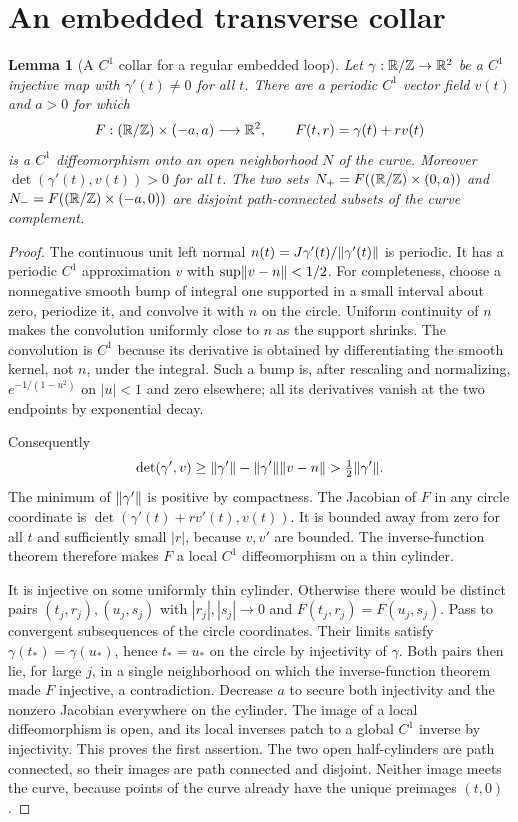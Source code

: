 \documentclass[11pt,oneside]{book}
\newtheorem{lemma}[theorem]{Lemma}
\theoremstyle{definition}
\theoremstyle{remark}\newtheorem{remark}[theorem]{Remark}
\newcommand{\R}{\mathbb R}\newcommand{\C}{\mathbb C}
\begin{document}
\section{An embedded transverse collar}
\begin{lemma}[A $C^1$ collar for a regular embedded loop]\label{d13:21:collar}
Let $\gamma:\R/\Z\to\R^2$ be a $C^1$ injective map with
$\gamma'(t)\ne0$ for all $t$. There are a periodic $C^1$ vector
field $v(t)$ and $a>0$ for which
\[
 F:(\R/\Z)\times(-a,a)\longrightarrow\R^2,
 \qquad F(t,r)=\gamma(t)+rv(t)
\]
is a $C^1$ diffeomorphism onto an open neighborhood $N$ of the curve.
Moreover $\det(\gamma'(t),v(t))>0$ for all $t$. The two sets
$N_+=F((\R/\Z)\times(0,a))$ and
$N_-=F((\R/\Z)\times(-a,0))$ are disjoint path-connected subsets
of the curve complement.
\end{lemma}
\begin{proof}
The continuous unit left normal
$n(t)=J\gamma'(t)/\lVert\gamma'(t)\rVert$ is periodic. It has a periodic
$C^1$ approximation $v$ with $\sup\lVert v-n\rVert<1/2$. For completeness,
choose a nonnegative smooth bump of integral one supported in a small
interval about zero, periodize it, and convolve it with $n$ on the
circle. Uniform continuity of $n$ makes the convolution uniformly
close to $n$ as the support shrinks. The convolution is $C^1$ because
its derivative is obtained by differentiating the smooth kernel, not
$n$, under the integral. Such a bump is, after rescaling and normalizing,
$e^{-1/(1-u^2)}$ on $|u|<1$ and zero elsewhere; all its derivatives
vanish at the two endpoints by exponential decay.

Consequently
\[
 \det(\gamma',v)\geq
 \lVert\gamma'\rVert-\lVert\gamma'\rVert\lVert v-n\rVert
 >\tfrac12\lVert\gamma'\rVert.
\]
The minimum of $\lVert\gamma'\rVert$ is positive by compactness. The
Jacobian of $F$ in any circle coordinate is
$\det(\gamma'(t)+rv'(t),v(t))$. It is bounded away from zero for
all $t$ and sufficiently small $|r|$, because $v,v'$ are bounded.
The inverse-function theorem therefore makes $F$ a local $C^1$
diffeomorphism on a thin cylinder.

It is injective on some uniformly thin cylinder. Otherwise there would
be distinct pairs $(t_j,r_j),(u_j,s_j)$ with
$|r_j|,|s_j|\to0$ and $F(t_j,r_j)=F(u_j,s_j)$.
Pass to convergent subsequences of the circle coordinates. Their
limits satisfy $\gamma(t_*)=\gamma(u_*)$, hence $t_*=u_*$ on the
circle by injectivity of $\gamma$. Both pairs then lie, for large
$j$, in a single neighborhood on which the inverse-function theorem
made $F$ injective, a contradiction. Decrease $a$ to secure both
injectivity and the nonzero Jacobian everywhere on the cylinder.
The image of a local diffeomorphism is open, and its local inverses
patch to a global $C^1$ inverse by injectivity. This proves the first
assertion. The two open half-cylinders are path connected, so their
images are path connected and disjoint. Neither image meets the curve,
because points of the curve already have the unique preimages $(t,0)$.
\end{proof}
\end{document}
